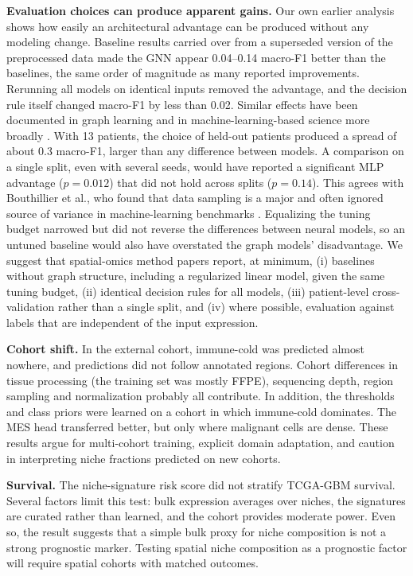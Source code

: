 \documentclass[11pt,letterpaper]{article}
\begin{document}
\textbf{Evaluation choices can produce apparent gains.} Our own earlier analysis shows how easily an architectural advantage can be produced without any modeling change. Baseline results carried over from a superseded version of the preprocessed data made the GNN appear 0.04--0.14 macro-F1 better than the baselines, the same order of magnitude as many reported improvements. Rerunning all models on identical inputs removed the advantage, and the decision rule itself changed macro-F1 by less than 0.02. Similar effects have been documented in graph learning \cite{shchur2018,errica2020} and in machine-learning-based science more broadly \cite{kapoor2023,varoquaux2022}. With 13 patients, the choice of held-out patients produced a spread of about 0.3 macro-F1, larger than any difference between models. A comparison on a single split, even with several seeds, would have reported a significant MLP advantage ($p = 0.012$) that did not hold across splits ($p = 0.14$). This agrees with Bouthillier et al., who found that data sampling is a major and often ignored source of variance in machine-learning benchmarks \cite{bouthillier2021}. Equalizing the tuning budget narrowed but did not reverse the differences between neural models, so an untuned baseline would also have overstated the graph models' disadvantage. We suggest that spatial-omics method papers report, at minimum, (i) baselines without graph structure, including a regularized linear model, given the same tuning budget, (ii) identical decision rules for all models, (iii) patient-level cross-validation rather than a single split, and (iv) where possible, evaluation against labels that are independent of the input expression.

\textbf{Cohort shift.} In the external cohort, immune-cold was predicted almost nowhere, and predictions did not follow annotated regions. Cohort differences in tissue processing (the training set was mostly FFPE), sequencing depth, region sampling and normalization probably all contribute. In addition, the thresholds and class priors were learned on a cohort in which immune-cold dominates. The MES head transferred better, but only where malignant cells are dense. These results argue for multi-cohort training, explicit domain adaptation, and caution in interpreting niche fractions predicted on new cohorts.

\textbf{Survival.} The niche-signature risk score did not stratify TCGA-GBM survival. Several factors limit this test: bulk expression averages over niches, the signatures are curated rather than learned, and the cohort provides moderate power. Even so, the result suggests that a simple bulk proxy for niche composition is not a strong prognostic marker. Testing spatial niche composition as a prognostic factor will require spatial cohorts with matched outcomes.
\end{document}
